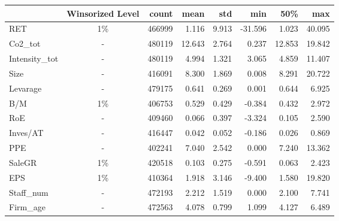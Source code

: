 \begin{tabular}{lcrrrrrr}
\toprule
{} &  Winsorized Level &    count &   mean &   std &     min &    50\% &    max \\
\midrule
RET      & 1\%    & 466999 &  1.116 & 9.913 & -31.596 &  1.023 & 40.095 \\
Co2\_tot   &  -  & 480119 & 12.643 & 2.764 &   0.237 & 12.853 & 19.842 \\
Intensity\_tot &  - & 480119 &  4.994 & 1.321 &   3.065 &  4.859 & 11.407 \\
Size     &  -   & 416091 &  8.300 & 1.869 &   0.008 &  8.291 & 20.722 \\
Levarage  &  -  & 479175 &  0.641 & 0.269 &   0.001 &  0.644 &  6.925 \\
B/M       &  1\%  & 406753 &  0.529 & 0.429 &  -0.384 &  0.432 &  2.972 \\
RoE       &  -  & 409460 &  0.066 & 0.397 &  -3.324 &  0.105 &  2.590 \\
Inves/AT  &  -  & 416447 &  0.042 & 0.052 &  -0.186 &  0.026 &  0.869 \\
PPE       &  -  & 402241 &  7.040 & 2.542 &   0.000 &  7.240 & 13.362 \\
SaleGR    &  1\%  & 420518 &  0.103 & 0.275 &  -0.591 &  0.063 &  2.423 \\
EPS       &  1\%  & 410364 &  1.918 & 3.146 &  -9.400 &  1.580 & 19.820 \\
Staff\_num  & -  & 472193 &  2.212 & 1.519 &   0.000 &  2.100 &  7.741 \\
Firm\_age   & -  & 472563 &  4.078 & 0.799 &   1.099 &  4.127 &  6.489 \\
\bottomrule
\end{tabular}
